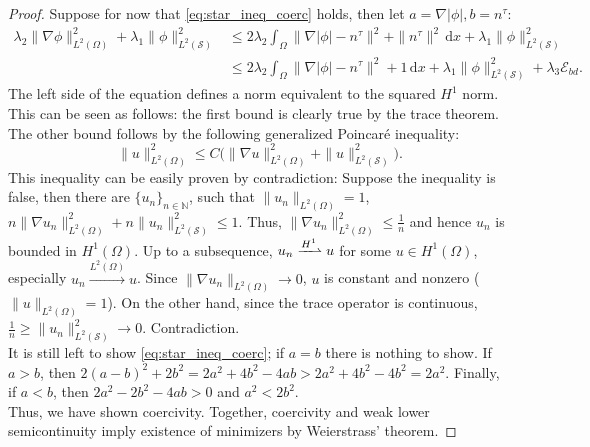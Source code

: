 \documentclass[12pt,openany]{book}
\def\S{\mathcal{S}}
\theoremstyle{plainnormal}
\theoremstyle{remark}
\begin{document}
\begin{proof}
Suppose for now that \cref{eq:star_ineq_coerc} holds, then let $a = \nabla |\phi|, b = n^\tau$: 
\begin{align*}
    \lambda_2\|\nabla \phi\| ^2_{L^2(\Omega)} + \lambda_1 \|\phi\| ^2_{L^2(\S)} &\leq 2 \lambda_2\int_\Omega \| \nabla |\phi| - n^\tau\|^2 
 + \|n^\tau\|^2\,\mathrm{d}x+ \lambda_1 \|\phi\| ^2_{L^2(\S)}\\
 &\leq 2 \lambda_2\int_\Omega \| \nabla |\phi| - n^\tau\|^2 
 + 1 \,\mathrm{d}x+ \lambda_1 \|\phi\| ^2_{L^2(\S)} + \lambda_3 \mathcal{E}_{bd}.
\end{align*} 
The left side of the equation defines a norm equivalent to the squared $H^1$ norm. This can be seen as follows: the first bound is clearly true by the trace theorem. The other bound follows by the following generalized Poincar\'e inequality: $$\|u\|^2_{L^2(\Omega)} \leq C\Big( \|\nabla u\|^2_{L^2(\Omega)} +  \|u\|^2_{L^2(\mathcal{\S})}\Big).$$
This inequality can be easily proven by contradiction: Suppose the inequality is false, then there are $\{u_n\}_{n\in\mathbb N}$, such that $\|u_n\|_{L^2(\Omega)} = 1$, $n\|\nabla u_n\|^2_{L^2(\Omega)} +  n\|u_n\|^2_{L^2(\mathcal{\S})} \leq 1$. Thus, $\|\nabla u_n\|^2_{L^2(\Omega)} \leq \frac{1}{n}$ and hence $u_n$ is bounded in $H^1(\Omega)$. Up to a subsequence, $u_n \xrightharpoonup{H^1}u$ for some $u\in H^1(\Omega)$, especially $u_n \xrightarrow{L^2(\Omega)}u$. Since $\|\nabla u_n\|_{L^2(\Omega)} \rightarrow 0$, $u$ is constant and nonzero ($\|u\|_{L^2(\Omega)} = 1$). On the other hand, since the trace operator is continuous, $\frac{1}{n} \geq \|u_n\|^2_{L^2(\S)} \rightarrow 0 $. Contradiction.\\
It is still left to show \cref{eq:star_ineq_coerc}; if $a=b$ there is nothing to show. If $a> b$, then $2(a-b)^2  + 2b^2 = 2a^2 + 4b^2 - 4ab > 2a^2 +4b^2 - 4b^2 = 2a^2 $. Finally, if $a<b$, then $2a^2 - 2b^2 - 4ab > 0$ and $a^2 < 2b^2$.\\
Thus, we have shown coercivity.
Together, coercivity and weak lower semicontinuity imply existence of minimizers by Weierstrass' theorem.
\end{proof}
\end{document}
